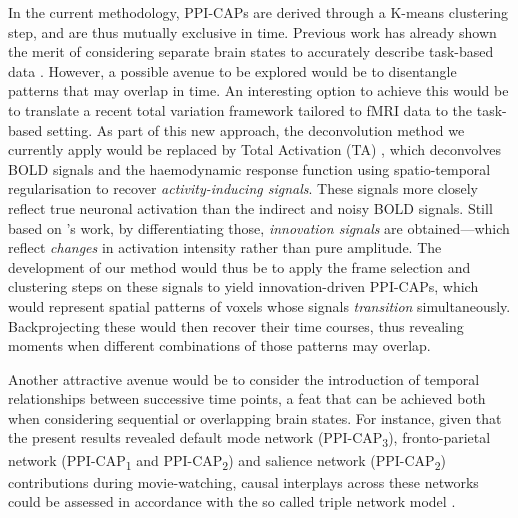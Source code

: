 In the current methodology, PPI-CAPs are derived through a K-means clustering step, and are thus mutually exclusive in time. Previous work has already shown the merit of considering separate brain states to accurately describe task-based data \citep{Leonardi2014,Gonzalez-Castillo2015a}. However, a possible avenue to be explored would be to disentangle patterns that may overlap in time. An interesting option to achieve this would be to translate a recent total variation framework tailored to fMRI data \citep{Karahanoglu2015a} to the task-based setting. As part of this new approach, the deconvolution method we currently apply would be replaced by Total Activation (TA) \citep{Karahanoglu2013}, which deconvolves BOLD signals and the haemodynamic response function using spatio-temporal regularisation to recover \textit{activity-inducing signals}. These signals more closely reflect true neuronal activation than the indirect and noisy BOLD signals. Still based on \citeauthor{Karahanoglu2013}'s work, by   differentiating those, \textit{innovation signals} are obtained---which reflect \textit{changes} in activation intensity rather than pure amplitude. The development of our method would thus be to apply the frame selection and clustering steps on these signals to yield innovation-driven PPI-CAPs, which would represent spatial patterns of voxels whose signals \textit{transition} simultaneously. Backprojecting these would then recover their time courses, thus revealing moments when different combinations of those patterns may overlap.   


Another attractive avenue would be to consider the introduction of temporal relationships between successive time points, a feat that can be achieved both when considering sequential \citep{Eavani2013,Chen2016, Vidaurre2017} or overlapping \citep{Sourty2016, Bolton2018a} brain states. For instance, given that the present results revealed default mode network (PPI-CAP\textsubscript{3}), fronto-parietal network (PPI-CAP\textsubscript{1} and PPI-CAP\textsubscript{2}) and salience network (PPI-CAP\textsubscript{2}) contributions during movie-watching, causal interplays across these networks could be assessed in accordance with the so called triple network model \citep{Menon2011}. 

